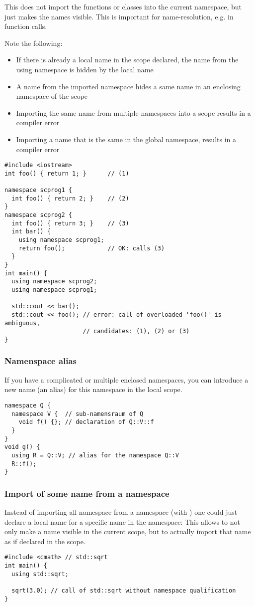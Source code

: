 This does not import the functions or classes into the current namespace, but just makes the names visible. This is important for name-resolution, e.g.
in function calls.

Note the following:
\begin{itemize}
\item If there is already a local name in the scope declared, the name from the using namespace is hidden by the local name
\item A name from the imported namespace hides a same name in an enclosing namespace of the scope
\item Importing the same name from multiple namespaces into a scope results in a compiler error
\item Importing a name that is the same in the global namespace, results in a compiler error
\end{itemize}

\begin{verbatim}
#include <iostream>
int foo() { return 1; }      // (1)

namespace scprog1 {
  int foo() { return 2; }    // (2)
}
namespace scprog2 {
  int foo() { return 3; }    // (3)
  int bar() {
    using namespace scprog1;
    return foo();            // OK: calls (3)
  }
}
int main() {
  using namespace scprog2;
  using namespace scprog1;

  std::cout << bar();
  std::cout << foo(); // error: call of overloaded 'foo()' is ambiguous,
                      // candidates: (1), (2) or (3)
}
\end{verbatim}

\subsubsection{Namenspace alias}
If you have a complicated or multiple enclosed namespaces, you can introduce a new name (an alias) for this namespace in the local scope.
%
\begin{verbatim}
namespace Q {
  namespace V {  // sub-namensraum of Q
    void f() {}; // declaration of Q::V::f
  }
}
void g() {
  using R = Q::V; // alias for the namespace Q::V
  R::f();
}
\end{verbatim}

\subsubsection{Import of some name from a namespace}
Instead of importing all namespace from a namespace (with ) one could just declare a local name for a specific name in the namespace:
This allows to not only make a name visible in the current scope, but to actually import that name as if declared in the scope.
%
\begin{verbatim}
#include <cmath> // std::sqrt
int main() {
  using std::sqrt;

  sqrt(3.0); // call of std::sqrt without namespace qualification
}
\end{verbatim}

